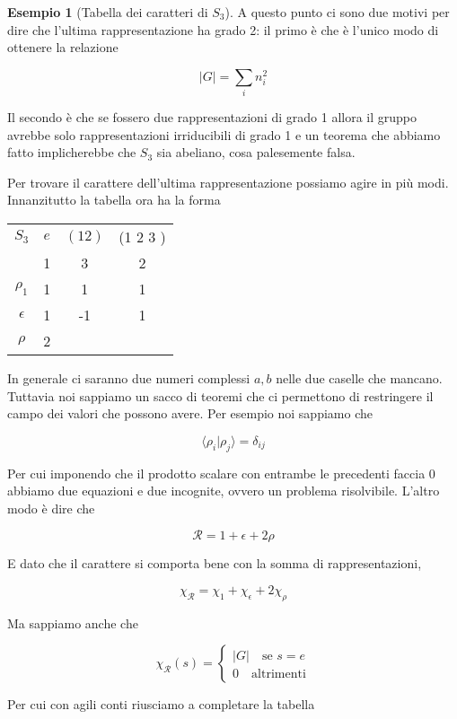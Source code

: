 \documentclass[11pt]{article}
\theoremstyle{plain}
\theoremstyle{definition}
\newtheorem{exmp}{Esempio}[section]
\theoremstyle{remark}
\newcommand{\dsum}{\displaystyle\sum}
\begin{document}
\begin{exmp}[Tabella dei caratteri di $S_3$]
A questo punto ci sono due motivi per dire che l'ultima rappresentazione ha grado 2: il primo è che è l'unico modo di ottenere la relazione

\[ |G | = \dsum_i n_i^2 \]

Il secondo è che se fossero due rappresentazioni di grado 1 allora il gruppo avrebbe solo rappresentazioni irriducibili di grado 1 e un teorema che abbiamo fatto implicherebbe che $S_3$ sia abeliano, cosa palesemente falsa. 

Per trovare il carattere dell'ultima rappresentazione possiamo agire in più modi. Innanzitutto la tabella ora ha la forma




\begin{table}[!ht]
\centering
\begin{tabular}{|c|c|c|c|}
\hline
$S_3$  & $e$ & $(1 2)$ & (1 2 3 )    \\
 & 1 & 3 & 2 \\
\hline
 $\rho_1$ & 1 & 1  & 1 \\
\hline
$\epsilon$ & 1 & -1 & 1 \\
\hline
$\rho$ & 2 &  & \\
\hline
\end{tabular}
\end{table}


In generale ci saranno due numeri complessi $a, b$ nelle due caselle che mancano. Tuttavia noi sappiamo un sacco di teoremi che ci permettono di restringere il campo dei valori che possono avere. Per esempio noi sappiamo che 

\[\langle \rho_i | \rho_j \rangle = \delta_{ij}\]
 
Per cui imponendo che il prodotto scalare con entrambe le precedenti faccia 0 abbiamo due equazioni e due incognite, ovvero un problema risolvibile. L'altro modo è dire che

\[ \mathcal{R} = 1 + \epsilon + 2\rho\]

E dato che il carattere si comporta bene con la somma di rappresentazioni, 

\[\chi_{\mathcal{R}} = \chi_1 + \chi_\epsilon + 2 \chi_\rho  \]

Ma sappiamo anche che 

\[ \chi_{\mathcal{R}}(s) = 
\begin{cases}
|G| \quad \text{se } s = e \\
0 \quad \text{altrimenti}
\end{cases}\]

Per cui con agili conti riusciamo a completare la tabella









\end{exmp}
\end{document}
